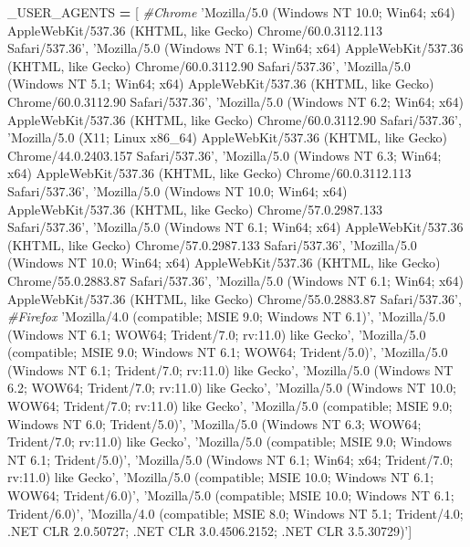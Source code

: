 \documentclass[
]{book}
\newenvironment{Shaded}{\begin{snugshade}}{\end{snugshade}}
\newcommand{\CommentTok}[1]{\textcolor[rgb]{0.37,0.37,0.37}{\textit{#1}}}
\newcommand{\NormalTok}[1]{#1}
\newcommand{\OperatorTok}[1]{\textcolor[rgb]{0.43,0.43,0.43}{\textbf{#1}}}
\newcommand{\StringTok}[1]{\textcolor[rgb]{0.5,0.5,0.5}{#1}}
\begin{document}
\begin{Shaded}
\begin{Highlighting}[]
\NormalTok{_USER_AGENTS }\OperatorTok{=}\NormalTok{ [}
   \CommentTok{#Chrome}
    \StringTok{'Mozilla/5.0 (Windows NT 10.0; Win64; x64) AppleWebKit/537.36 (KHTML, like Gecko) Chrome/60.0.3112.113 Safari/537.36'}\NormalTok{,}
    \StringTok{'Mozilla/5.0 (Windows NT 6.1; Win64; x64) AppleWebKit/537.36 (KHTML, like Gecko) Chrome/60.0.3112.90 Safari/537.36'}\NormalTok{,}
    \StringTok{'Mozilla/5.0 (Windows NT 5.1; Win64; x64) AppleWebKit/537.36 (KHTML, like Gecko) Chrome/60.0.3112.90 Safari/537.36'}\NormalTok{,}
    \StringTok{'Mozilla/5.0 (Windows NT 6.2; Win64; x64) AppleWebKit/537.36 (KHTML, like Gecko) Chrome/60.0.3112.90 Safari/537.36'}\NormalTok{,}
    \StringTok{'Mozilla/5.0 (X11; Linux x86_64) AppleWebKit/537.36 (KHTML, like Gecko) Chrome/44.0.2403.157 Safari/537.36'}\NormalTok{,}
    \StringTok{'Mozilla/5.0 (Windows NT 6.3; Win64; x64) AppleWebKit/537.36 (KHTML, like Gecko) Chrome/60.0.3112.113 Safari/537.36'}\NormalTok{,}
    \StringTok{'Mozilla/5.0 (Windows NT 10.0; Win64; x64) AppleWebKit/537.36 (KHTML, like Gecko) Chrome/57.0.2987.133 Safari/537.36'}\NormalTok{,}
    \StringTok{'Mozilla/5.0 (Windows NT 6.1; Win64; x64) AppleWebKit/537.36 (KHTML, like Gecko) Chrome/57.0.2987.133 Safari/537.36'}\NormalTok{,}
    \StringTok{'Mozilla/5.0 (Windows NT 10.0; Win64; x64) AppleWebKit/537.36 (KHTML, like Gecko) Chrome/55.0.2883.87 Safari/537.36'}\NormalTok{,}
    \StringTok{'Mozilla/5.0 (Windows NT 6.1; Win64; x64) AppleWebKit/537.36 (KHTML, like Gecko) Chrome/55.0.2883.87 Safari/537.36'}\NormalTok{,}
    \CommentTok{#Firefox}
    \StringTok{'Mozilla/4.0 (compatible; MSIE 9.0; Windows NT 6.1)'}\NormalTok{,}
    \StringTok{'Mozilla/5.0 (Windows NT 6.1; WOW64; Trident/7.0; rv:11.0) like Gecko'}\NormalTok{,}
    \StringTok{'Mozilla/5.0 (compatible; MSIE 9.0; Windows NT 6.1; WOW64; Trident/5.0)'}\NormalTok{,}
    \StringTok{'Mozilla/5.0 (Windows NT 6.1; Trident/7.0; rv:11.0) like Gecko'}\NormalTok{,}
    \StringTok{'Mozilla/5.0 (Windows NT 6.2; WOW64; Trident/7.0; rv:11.0) like Gecko'}\NormalTok{,}
    \StringTok{'Mozilla/5.0 (Windows NT 10.0; WOW64; Trident/7.0; rv:11.0) like Gecko'}\NormalTok{,}
    \StringTok{'Mozilla/5.0 (compatible; MSIE 9.0; Windows NT 6.0; Trident/5.0)'}\NormalTok{,}
    \StringTok{'Mozilla/5.0 (Windows NT 6.3; WOW64; Trident/7.0; rv:11.0) like Gecko'}\NormalTok{,}
    \StringTok{'Mozilla/5.0 (compatible; MSIE 9.0; Windows NT 6.1; Trident/5.0)'}\NormalTok{,}
    \StringTok{'Mozilla/5.0 (Windows NT 6.1; Win64; x64; Trident/7.0; rv:11.0) like Gecko'}\NormalTok{,}
    \StringTok{'Mozilla/5.0 (compatible; MSIE 10.0; Windows NT 6.1; WOW64; Trident/6.0)'}\NormalTok{,}
    \StringTok{'Mozilla/5.0 (compatible; MSIE 10.0; Windows NT 6.1; Trident/6.0)'}\NormalTok{,}
    \StringTok{'Mozilla/4.0 (compatible; MSIE 8.0; Windows NT 5.1; Trident/4.0; .NET CLR 2.0.50727; .NET CLR 3.0.4506.2152; .NET CLR 3.5.30729)'}\NormalTok{]}
\end{Highlighting}
\end{Shaded}
\end{document}
